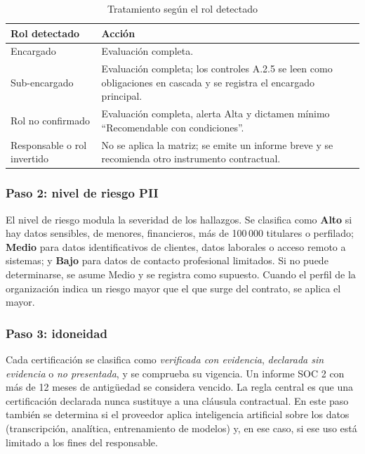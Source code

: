 \documentclass[12pt,letterpaper]{article}
\begin{document}
\begin{table}[H]
\centering
\small
\caption{Tratamiento según el rol detectado}
\label{tab:roles}
\begin{tabularx}{\linewidth}{@{}L{4.2cm} Y@{}}
\toprule
\textbf{Rol detectado} & \textbf{Acción} \\
\midrule
Encargado & Evaluación completa. \\
Sub-encargado & Evaluación completa; los controles A.2.5 se leen como obligaciones en cascada y se registra el encargado principal. \\
Rol no confirmado & Evaluación completa, alerta Alta y dictamen mínimo ``Recomendable con condiciones''. \\
Responsable o rol invertido & No se aplica la matriz; se emite un informe breve y se recomienda otro instrumento contractual. \\
\bottomrule
\end{tabularx}
\end{table}

\subsubsection{Paso 2: nivel de riesgo PII}

El nivel de riesgo modula la severidad de los hallazgos. Se clasifica como \textbf{Alto} si hay datos sensibles, de menores, financieros, más de 100\,000 titulares o perfilado; \textbf{Medio} para datos identificativos de clientes, datos laborales o acceso remoto a sistemas; y \textbf{Bajo} para datos de contacto profesional limitados. Si no puede determinarse, se asume Medio y se registra como supuesto. Cuando el perfil de la organización indica un riesgo mayor que el que surge del contrato, se aplica el mayor.

\subsubsection{Paso 3: idoneidad}

Cada certificación se clasifica como \emph{verificada con evidencia}, \emph{declarada sin evidencia} o \emph{no presentada}, y se comprueba su vigencia. Un informe SOC 2 con más de 12 meses de antigüedad se considera vencido. La regla central es que una certificación declarada nunca sustituye a una cláusula contractual. En este paso también se determina si el proveedor aplica inteligencia artificial sobre los datos (transcripción, analítica, entrenamiento de modelos) y, en ese caso, si ese uso está limitado a los fines del responsable.
\end{document}
